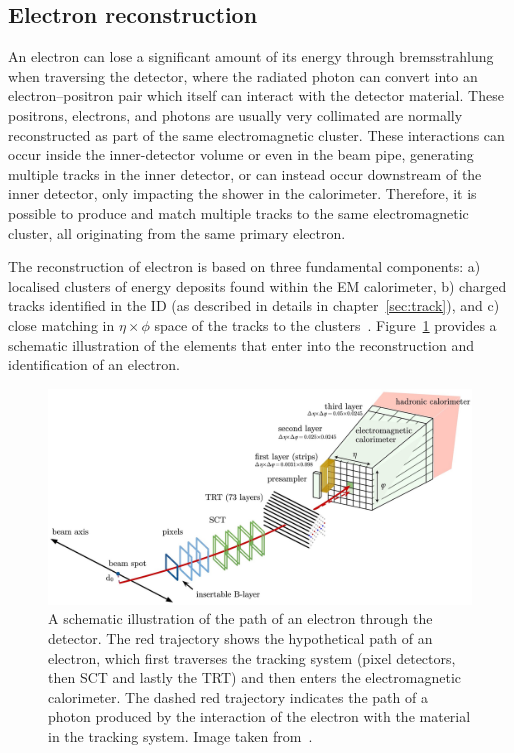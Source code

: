 \subsection{Electron reconstruction}
An electron can lose a significant amount of its energy through bremsstrahlung when traversing the detector,  
where the radiated photon can convert into an electron–positron pair which itself can
interact with the detector material. These positrons, electrons, and photons are usually very
collimated are normally reconstructed as part of the same electromagnetic cluster. 
These interactions can occur inside the inner-detector volume or even in the beam pipe, generating multiple tracks
in the inner detector, or can instead occur downstream of the inner detector, only impacting the shower in
the calorimeter. Therefore, it is possible to produce and match multiple tracks to the same electromagnetic
cluster, all originating from the same primary electron.

The reconstruction of electron is based on three fundamental components: 
a) localised clusters of energy deposits found within the EM calorimeter, 
b) charged tracks identified in the ID (as described in details in chapter~\ref{sec:track}),
and c) close matching in $\eta \times \phi$ space of the tracks to the clusters~\cite{PERF-2017-01}.
Figure~\ref{fig:electron_recon} provides a schematic illustration of the elements that enter into
the reconstruction and identification of an electron. 
\begin{figure}[bht]
    \begin{centering}	
    \includegraphics[width=.8\textwidth]{Reconstruction_plots/electron.jpg}
    \caption{A schematic illustration of the path of an electron through the detector. 
    The red trajectory shows the 
    hypothetical path of an electron, which first traverses the tracking system (pixel detectors, then SCT
    and lastly the TRT) and then enters the electromagnetic calorimeter. 
    The dashed red trajectory indicates the path of a
    photon produced by the interaction of the electron with the material in the tracking system. 
    Image taken from~\cite{PERF-2017-01}.
        }
    \label{fig:electron_recon}
    \end{centering}
\end{figure}

